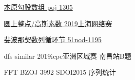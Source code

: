 





\vbox{}

\vbox{}

\begin{problemset}
	\item \href{http://poj.org/problem?id=1305}{本原勾股数组 \quad poj 1305}
	\item \href{https://nanti.jisuanke.com/t/41421}{圆上整点/高斯素数 \quad 2019上海网络赛}
	\item \href{https://www.51nod.com/Challenge/Problem.html#problemId=1195}{斐波那契数列循环节 \quad 51nod-1195}
	\item dfs similar \quad 2019icpc亚洲区域赛-南昌站B题
	\item FFT \quad BZOJ 3992 SDOI2015 序列统计
\end{problemset}


\nocite{*} 

